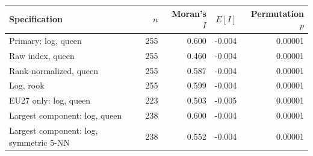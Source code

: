 \begin{tabular}{lrrrr}
\toprule
Specification & $n$ & Moran's $I$ & $E[I]$ & Permutation $p$ \\
\midrule
Primary: log, queen & 255 & 0.600 & -0.004 & 0.00001 \\
Raw index, queen & 255 & 0.460 & -0.004 & 0.00001 \\
Rank-normalized, queen & 255 & 0.587 & -0.004 & 0.00001 \\
Log, rook & 255 & 0.599 & -0.004 & 0.00001 \\
EU27 only: log, queen & 223 & 0.503 & -0.005 & 0.00001 \\
Largest component: log, queen & 238 & 0.600 & -0.004 & 0.00001 \\
Largest component: log, symmetric 5-NN & 238 & 0.552 & -0.004 & 0.00001 \\
\bottomrule
\end{tabular}
